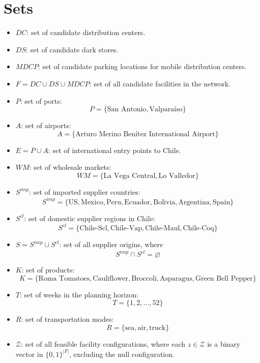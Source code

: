 \documentclass[12pt]{article}
\begin{document}
\section{Sets}
\begin{itemize}
    \item $DC$: set of candidate distribution centers.
    
    \item $DS$: set of candidate dark stores.
    
    \item $MDCP$: set of candidate parking locations for mobile distribution centers.
    
    \item $F = DC \cup DS \cup MDCP$: set of all candidate facilities in the network.
    
    \item $P$: set of ports:
    \[
    P = \{\text{San Antonio}, \text{Valparaíso}\}
    \]
    
    \item $A$: set of airports:
    \[
    A = \{\text{Arturo Merino Benítez International Airport}\}
    \]

    \item $E = P \cup A$: set of international entry points to Chile.
    
    \item $WM$: set of wholesale markets:
    \[
    WM = \{\text{La Vega Central}, \text{Lo Valledor}\}
    \]
    
    \item $S^{imp}$: set of imported supplier countries:
    \[
    S^{imp} = \{\mathrm{US}, \mathrm{Mexico}, \mathrm{Peru}, \mathrm{Ecuador}, \mathrm{Bolivia}, \mathrm{Argentina}, \mathrm{Spain}\}
    \]

    \item $S^{cl}$: set of domestic supplier regions in Chile:
    \[
    S^{cl} = \{\mathrm{Chile\text{-}Scl}, \mathrm{Chile\text{-}Vap}, \mathrm{Chile\text{-}Maul}, \mathrm{Chile\text{-}Coq}\}
    \]

    \item $S = S^{imp} \cup S^{cl}$: set of all supplier origins, where
    \[
    S^{imp} \cap S^{cl} = \varnothing
    \]

    \item $K$: set of products:
    \[
    K = \{\text{Roma Tomatoes}, \text{Cauliflower}, \text{Broccoli}, \text{Asparagus}, \text{Green Bell Pepper}\}
    \]
    
    \item $T$: set of weeks in the planning horizon:
    \[
    T = \{1, 2, \dots, 52\}
    \]
    
    \item $R$: set of transportation modes:
    \[
    R = \{\text{sea}, \text{air}, \text{truck}\}
    \]

    \item $\mathcal{Z}$: set of all feasible facility configurations, where each $z \in \mathcal{Z}$ is a binary vector in $\{0,1\}^{|F|}$, excluding the null configuration.

\end{itemize}
\newpage
\end{document}

